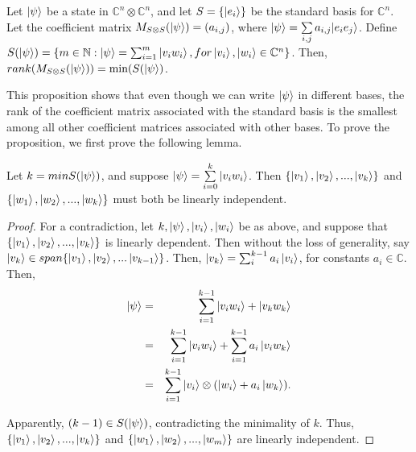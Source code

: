 \begin{prop}
\label{rank prop}
Let $\ket{\psi}$ be a state in $\mathbb{C}^n \otimes \mathbb{C}^n$, and let $S=\{\ket{e_i}\}$ be the standard basis for $\mathbb{C}^n$. Let the coefficient matrix $M_{S \otimes S}(\ket{\psi})=(a_{i,j})$, where $\ket{\psi}=\sum\limits_{i,j}a_{i,j}|e_i e_j\rangle$.  Define $S(\ket{\psi})=\{m\in \mathbb{N}: \ket{\psi}=\sum_{i=1}^m\ket{v_i w_i}, for \ket{v_i}, \ket{w_i} \in \mathbb{C}^n\}$.  Then, $rank(M_{S \otimes S}(\ket{\psi}))=\textrm{min} (S(\ket{\psi})$.
\end{prop}
This proposition shows that even though we can write $\ket{\psi}$ in different bases, the rank of the coefficient matrix associated with the standard basis is the smallest among all other coefficient matrices associated with other bases. To prove the proposition, we first prove the following lemma.

\begin{lemma}
\label{independence lemma}
Let $k=min S(\ket{\psi})$, and suppose $\ket{\psi}=\sum\limits_{i=0}^k \ket{v_iw_i}$.  Then $\{\ket{v_1}, \ket{v_2},...,\ket{v_k}\}$ and $\{\ket{w_1}, \ket{w_2},...,\ket{w_k}\}$ must both be linearly independent.
\end{lemma}

\begin{proof}
For a contradiction, let $k, \ket{\psi}, \ket{v_i}, \ket{w_i}$ be as above, and suppose that $\{\ket{v_1}, \ket{v_2},...,\ket{v_k}\}$ is linearly dependent. Then without the loss of generality, say $\ket{v_k} \in span\{\ket{v_1}, \ket{v_2},...\ket{v_{k-1}}\}$. Then, $\ket{v_k}=\sum_i^{k-1} a_i \ket{v_i}$, for constants $a_i \in \mathbb{C}$.  Then, 
\begin{eqnarray*}
\ket{\psi}&=&\sum_{i=1}^{k-1} \ket{v_i w_i} + \ket{v_k w_k}\\
&=&\sum_{i=1}^{k-1} \ket{v_i w_i} + \sum_{i=1}^{k-1} a_i\ket{v_iw_k}\\
&=&\sum_{i=1}^{k-1} \ket{v_i} \otimes (\ket{w_i}+a_i\ket{w_k}).\\
\end{eqnarray*}

Apparently, $(k-1) \in S(\ket{\psi})$, contradicting the minimality of $k$.  Thus, $\{\ket{v_1}, \ket{v_2},...,\ket{v_k}\}$ and $\{\ket{w_1}, \ket{w_2},...,\ket{w_m}\}$ are linearly independent.
\end{proof}

